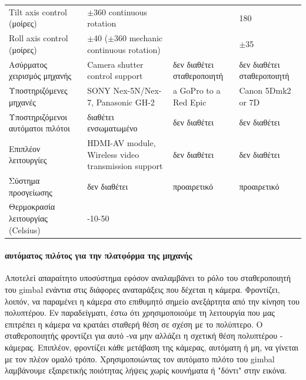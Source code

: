 \documentclass[a4paper, 12pt, twoside]{report}
\begin{document}
{{{{{{\begin{landscape}
\begin{longtable} { m{3cm} m{3.5cm} m{3.5cm} m{3.5cm}}
					Tilt axis control (μοίρες) & $\pm$360 continuous rotation & & 180\\
					Roll axis control (μοίρες) & $\pm$40 ($\pm$360 mechanic continuous rotation) & & $\pm$35\\
					\hdashline
					Ασύρματος χειρισμός μηχανής & Camera shutter control support & δεν διαθέτει σταθεροποιητή & δεν διαθέτει σταθεροποιητή\\
					\hdashline
					Υποστηριζόμενες μηχανές & SONY Nex-5N/Nex-7, Panasonic GH-2 & a GoPro to a Red Epic & Canon 5Dmk2 or 7D\\
					\hdashline
					Υποστηριζόμενοι αυτόματοι πιλότοι & διαθέτει ενσωματωμένο & δεν διαθέτει & δεν διαθέτει\\
					\hdashline
					Επιπλέον λειτουργίες & HDMI-AV module, Wireless video transmission support & δεν διαθέτει & δεν διαθέτει\\
					\hdashline
					Σύστημα προσγείωσης & δεν διαθέτει & προαιρετικό & προαιρετικό\\
					\hdashline
					Θερμοκρασία λειτουργίας (Celsius) & -10-50 & & \\
					\hline
				\end{longtable}
				\end{landscape}
				
			\paragraph{αυτόματος πιλότος για την πλατφόρμα της μηχανής}{Αποτελεί απαραίτητο υποσύστημα εφόσον αναλαμβάνει το ρόλο του σταθεροποιητή του gimbal ενάντια στις διάφορες αναταράξεις που δέχεται η κάμερα. Φροντίζει, λοιπόν, να παραμένει η κάμερα στο επιθυμητό σημείο ανεξάρτητα από την κίνηση του πολυπτέρου. Εν παραδείγματι, έστω ότι χρησιμοποιούμε τη λειτουργία που μας επιτρέπει η κάμερα να κρατάει σταθερή θέση σε σχέση με το πολύπτερο. Ο σταθεροποιητής φροντίζει για αυτό -να μην αλλάζει η σχετική θέση πολυπτέρου - κάμερας. Επιπλέον, φροντίζει κάθε μετάβαση της κάμερας, αυτόματη ή μη, να γίνεται με τον πλέον ομαλό τρόπο. Χρησιμοποιώντας τον αυτόματο πιλότο του gimbal λαμβάνουμε εξαιρετικής ποιότητας λήψεις χωρίς κουνήματα ή "δόντι" στην εικόνα.
			}
			
			\begin{landscape}	
			\setlength\LTleft{0pt}            %
			\setlength\LTright{0pt}           %
	

\end{landscape}}}}}}}
\end{document}
